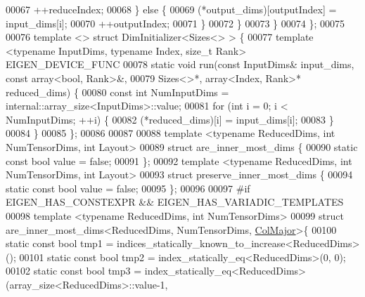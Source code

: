 \begin{DoxyCode}
00067         ++reduceIndex;
00068       \} \textcolor{keywordflow}{else} \{
00069         (*output\_dims)[outputIndex] = input\_dims[i];
00070         ++outputIndex;
00071       \}
00072     \}
00073   \}
00074 \};
00075 
00076 \textcolor{keyword}{template} <> \textcolor{keyword}{struct }DimInitializer<Sizes<> > \{
00077   \textcolor{keyword}{template} <\textcolor{keyword}{typename} InputDims, \textcolor{keyword}{typename} Index, \textcolor{keywordtype}{size\_t} Rank> EIGEN\_DEVICE\_FUNC
00078   \textcolor{keyword}{static} \textcolor{keywordtype}{void} run(\textcolor{keyword}{const} InputDims& input\_dims, \textcolor{keyword}{const} array<bool, Rank>&,
00079                   Sizes<>*, array<Index, Rank>* reduced\_dims) \{
00080     \textcolor{keyword}{const} \textcolor{keywordtype}{int} NumInputDims = internal::array\_size<InputDims>::value;
00081     \textcolor{keywordflow}{for} (\textcolor{keywordtype}{int} i = 0; i < NumInputDims; ++i) \{
00082       (*reduced\_dims)[i] = input\_dims[i];
00083     \}
00084   \}
00085 \};
00086 
00087 
00088 \textcolor{keyword}{template} <\textcolor{keyword}{typename} ReducedDims, \textcolor{keywordtype}{int} NumTensorDims, \textcolor{keywordtype}{int} Layout>
00089 \textcolor{keyword}{struct }are\_inner\_most\_dims \{
00090   \textcolor{keyword}{static} \textcolor{keyword}{const} \textcolor{keywordtype}{bool} value = \textcolor{keyword}{false};
00091 \};
00092 \textcolor{keyword}{template} <\textcolor{keyword}{typename} ReducedDims, \textcolor{keywordtype}{int} NumTensorDims, \textcolor{keywordtype}{int} Layout>
00093 \textcolor{keyword}{struct }preserve\_inner\_most\_dims \{
00094   \textcolor{keyword}{static} \textcolor{keyword}{const} \textcolor{keywordtype}{bool} value = \textcolor{keyword}{false};
00095 \};
00096 
00097 \textcolor{preprocessor}{#if EIGEN\_HAS\_CONSTEXPR && EIGEN\_HAS\_VARIADIC\_TEMPLATES}
00098 \textcolor{keyword}{template} <\textcolor{keyword}{typename} ReducedDims, \textcolor{keywordtype}{int} NumTensorDims>
00099 \textcolor{keyword}{struct }are\_inner\_most\_dims<ReducedDims, NumTensorDims, \hyperlink{group__enums_ggaacded1a18ae58b0f554751f6cdf9eb13a0cbd4bdd0abcfc0224c5fcb5e4f6669a}{ColMajor}>\{
00100   \textcolor{keyword}{static} \textcolor{keyword}{const} \textcolor{keywordtype}{bool} tmp1 = indices\_statically\_known\_to\_increase<ReducedDims>();
00101   \textcolor{keyword}{static} \textcolor{keyword}{const} \textcolor{keywordtype}{bool} tmp2 = index\_statically\_eq<ReducedDims>(0, 0);
00102   \textcolor{keyword}{static} \textcolor{keyword}{const} \textcolor{keywordtype}{bool} tmp3 = index\_statically\_eq<ReducedDims>(array\_size<ReducedDims>::value-1, 

\end{DoxyCode}

